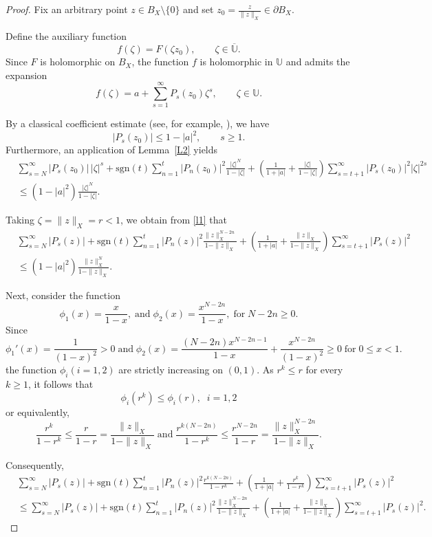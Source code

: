 \documentclass[11pt, reqno]{amsart}
\newtheorem*{cor A}{Corollary A}
\newtheorem*{cor B}{Corollary B}
\numberwithin{equation}{section}
\begin{document}
\begin{proof}
Fix an arbitrary point $z\in B_X\setminus\{0\}$ and set $z_0=\frac{z}{\|z\|_X}\in \partial B_X.$

Define the auxiliary function
\[
f(\zeta)=F(\zeta z_0), \qquad \zeta\in \overline{\mathbb U}.
\]
Since $F$ is holomorphic on $B_X$, the function $f$ is holomorphic in $\mathbb U$ and admits the expansion
\[
f(\zeta)=a+\sum_{s=1}^{\infty}P_s(z_0)\zeta^s,
\qquad \zeta\in\mathbb U.
\]

By a classical coefficient estimate (see, for example, \cite[p.~35]{GK2003}), we have
\begin{equation}\label{l0}
|P_s(z_0)|\le 1-|a|^2,\qquad s\ge1.
\end{equation}
Furthermore, an application of Lemma~\ref{L2} yields
\begin{align}
&\sum_{s=N}^{\infty}|P_s(z_0)|\,|\zeta|^s+\text{sgn}(t)\sum_{n=1}^t|P_n(z_0)|^2\frac{|\zeta|^N}{1-|\zeta|}
+\left(\frac{1}{1+|a|}+\frac{|\zeta|}{1-|\zeta|}\right)
\sum_{s=t+1}^{\infty}|P_s(z_0)|^2|\zeta|^{2s}
\nonumber\\
&\le
(1-|a|^2)\frac{|\zeta|^N}{1-|\zeta|}.
\label{l1}
\end{align}

Taking $\zeta=\|z\|_X=r<1$, we obtain from \eqref{l1} that
\begin{align}
&\sum_{s=N}^{\infty}|P_s(z)|
+\text{sgn}(t)\sum_{n=1}^t|P_n(z)|^2\frac{\|z\|_X^{N-2n}}{1-\|z\|_X}
+\left(\frac{1}{1+|a|}
+\frac{\|z\|_X}{1-\|z\|_X}\right)
\sum_{s=t+1}^{\infty}|P_s(z)|^2
\nonumber\\
&\le
(1-|a|^2)\frac{\|z\|_X^N}{1-\|z\|_X}.
\label{hhh1}
\end{align}

Next, consider the function
\[
\phi_1(x)=\frac{x}{1-x}, \;\text{and}\;\phi_2(x)=\frac{x^{N-2n}}{1-x}, \;\text{for}\;N-2n\geq 0.
\]
Since
\[
\phi_1'(x)=\frac{1}{(1-x)^2}>0\;\text{and}\; \phi_2(x)=\frac{(N-2n)x^{N-2n-1}}{1-x}+\frac{x^{N-2n}}{(1-x)^2}\geq 0 \;\text{for}\;0\leq x<1.
\]
the function $\phi_i(i=1,2)$ are strictly increasing on $(0,1)$. As $r^k\le r$ for every $k\ge1$, it follows that
\[
\phi_i(r^k)\le \phi_i(r),\; \;i=1,2
\]
or equivalently,
\[
\frac{r^k}{1-r^k}
\le
\frac{r}{1-r}
=
\frac{\|z\|_X}{1-\|z\|_X}\;\text{and}\; \frac{r^{k(N-2n)}}{1-r^k}\leq \frac{r^{N-2n}}{1-r}=\frac{\|z\|_X^{N-2n}}{1-\|z\|_X}.
\]

Consequently,
\begin{align}
&\sum_{s=N}^{\infty}|P_s(z)|
+\text{sgn}(t)\sum_{n=1}^t|P_n(z)|^2\frac{r^{k(N-2n)}}{1-r^k}
+\left(\frac{1}{1+|a|}
+\frac{r^k}{1-r^k}\right)
\sum_{s=t+1}^{\infty}|P_s(z)|^2
\nonumber\\
&\le
\sum_{s=N}^{\infty}|P_s(z)|
+\text{sgn}(t)\sum_{n=1}^t|P_n(z)|^2\frac{\|z\|_X^{N-2n}}{1-\|z\|_X}
+\left(\frac{1}{1+|a|}
+\frac{\|z\|_X}{1-\|z\|_X}\right)
\sum_{s=t+1}^{\infty}|P_s(z)|^2.
\label{aq1}
\end{align}


\end{proof}
\end{document}
